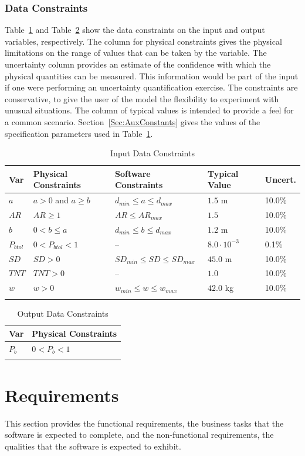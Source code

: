 \documentclass[12pt]{article}
\begin{document}
\subsubsection{Data Constraints}
\label{Sec:DataConstraints}
Table~\ref{Table:InDataConstraints} and Table~\ref{Table:OutDataConstraints} show the data constraints on the input and output variables, respectively. The column for physical constraints gives the physical limitations on the range of values that can be taken by the variable. The uncertainty column provides an estimate of the confidence with which the physical quantities can be measured. This information would be part of the input if one were performing an uncertainty quantification exercise. The constraints are conservative, to give the user of the model the flexibility to experiment with unusual situations. The column of typical values is intended to provide a feel for a common scenario. Section~\ref{Sec:AuxConstants} gives the values of the specification parameters used in Table~\ref{Table:InDataConstraints}.
\begin{longtable}{l l l l l}
\toprule
Var & Physical Constraints & Software Constraints & Typical Value & Uncert.
\\
\midrule
$a$ & $a>0$ and $a\geq{}b$ & ${d_{min}}\leq{}a\leq{}{d_{max}}$ & $1.5$ m & 10.0\%
\\
$AR$ & $AR\geq{}1$ & $AR\leq{}{AR_{max}}$ & $1.5$ & 10.0\%
\\
$b$ & $0<b\leq{}a$ & ${d_{min}}\leq{}b\leq{}{d_{max}}$ & $1.2$ m & 10.0\%
\\
${P_{btol}}$ & $0<{P_{btol}}<1$ & -- & $8.0\cdot{}10^{-3}$ & 0.1\%
\\
$SD$ & $SD>0$ & ${SD_{min}}\leq{}SD\leq{}{SD_{max}}$ & $45.0$ m & 10.0\%
\\
$TNT$ & $TNT>0$ & -- & $1.0$ & 10.0\%
\\
$w$ & $w>0$ & ${w_{min}}\leq{}w\leq{}{w_{max}}$ & $42.0$ kg & 10.0\%
\\
\bottomrule
\caption{Input Data Constraints}
\label{Table:InDataConstraints}
\end{longtable}
\begin{longtable}{l l}
\toprule
Var & Physical Constraints
\\
\midrule
${P_{b}}$ & $0<{P_{b}}<1$
\\
\bottomrule
\caption{Output Data Constraints}
\label{Table:OutDataConstraints}
\end{longtable}
\section{Requirements}
\label{Sec:Requirements}
This section provides the functional requirements, the business tasks that the software is expected to complete, and the non-functional requirements, the qualities that the software is expected to exhibit.
\end{document}
